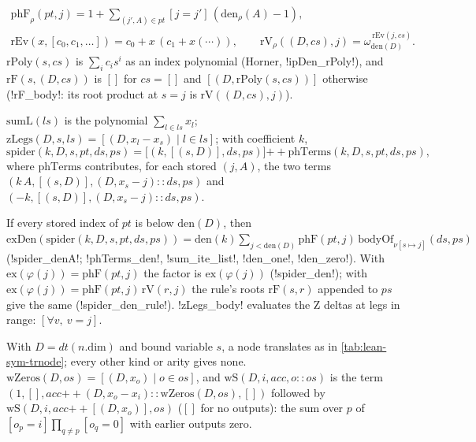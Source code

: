 \begin{definition}
\begin{gather*}
\mathrm{phF}_\rho(\mathit{pt},j)=1+\sum_{(j',A)\in\mathit{pt}}[j=j']\,(\mathrm{den}_\rho(A)-1),\\
\mathrm{rEv}(x,[c_0,c_1,\dots])=c_0+x\,(c_1+x(\cdots)),\qquad
\mathrm{rV}_\rho((D,cs),j)=\omega_{\mathrm{den}(D)}^{\,\mathrm{rEv}(j,cs)}.
\end{gather*}
$\mathrm{rPoly}(s,cs)$ is $\sum_ic_is^i$ as an index polynomial (Horner, \lean!ipDen_rPoly!), and $\mathrm{rF}(s,(D,cs))$ is $[]$ for $cs=[]$ and $[(D,\mathrm{rPoly}(s,cs))]$ otherwise (\lean!rF_body!: its root product at $s=j$ is $\mathrm{rV}((D,cs),j)$).
\end{definition}

\begin{definition}
$\mathrm{sumL}(ls)$ is the polynomial $\sum_{l\in ls}x_l$; $\mathrm{zLegs}(D,s,ls)=[(D,x_l-x_s)\mid l\in ls]$; with coefficient $k$,
\[
\mathrm{spider}(k,D,s,\mathit{pt},ds,ps)=\bigl[(k,[(s,D)],ds,ps)\bigr]\mathbin{+\!\!+}\mathrm{phTerms}(k,D,s,\mathit{pt},ds,ps),
\]
where $\mathrm{phTerms}$ contributes, for each stored $(j,A)$, the two terms $(k\,A,[(s,D)],(D,x_s-j)\mathbin{::}ds,ps)$ and $(-k,[(s,D)],(D,x_s-j)\mathbin{::}ds,ps)$.
\end{definition}

\begin{proposition}
If every stored index of $\mathit{pt}$ is below $\mathrm{den}(D)$, then $\mathrm{exDen}(\mathrm{spider}(k,D,s,\mathit{pt},ds,ps))=\mathrm{den}(k)\sum_{j<\mathrm{den}(D)}\mathrm{phF}(\mathit{pt},j)\,\mathrm{bodyOf}_{\nu[s\mapsto j]}(ds,ps)$ (\lean!spider_denA!; \lean!phTerms_den!, \lean!sum_ite_list!, \lean!den_one!, \lean!den_zero!). With $\mathrm{ex}(\varphi(j))=\mathrm{phF}(\mathit{pt},j)$ the factor is $\mathrm{ex}(\varphi(j))$ (\lean!spider_den!); with $\mathrm{ex}(\varphi(j))=\mathrm{phF}(\mathit{pt},j)\,\mathrm{rV}(r,j)$ the rule's roots $\mathrm{rF}(s,r)$ appended to $ps$ give the same (\lean!spider_den_rule!). \lean!zLegs_body! evaluates the Z deltas at legs in range: $[\forall v,\ v=j]$.
\end{proposition}

\begin{definition}\label{def:lean-sym-trnode}
With $D=\mathit{dt}(n.\mathrm{dim})$ and bound variable $s$, a node translates as in \cref{tab:lean-sym-trnode}; every other kind or arity gives $\mathrm{none}$. $\mathrm{wZeros}(D,os)=[(D,x_o)\mid o\in os]$, and $\mathrm{wS}(D,i,\mathit{acc},o\mathbin{::}os)$ is the term $(1,[],\mathit{acc}\mathbin{+\!\!+}(D,x_o-x_i)\mathbin{::}\mathrm{wZeros}(D,os),[])$ followed by $\mathrm{wS}(D,i,\mathit{acc}\mathbin{+\!\!+}[(D,x_o)],os)$ ($[]$ for no outputs): the sum over $p$ of $[o_p=i]\prod_{q\neq p}[o_q=0]$ with earlier outputs zero.
\end{definition}

